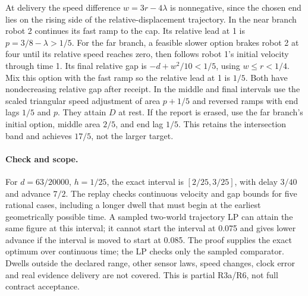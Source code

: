 \documentclass[11pt]{article}
\begin{document}
At delivery the speed difference \(w=3r-4\lambda\) is
nonnegative, since the chosen end lies on the rising side
of the relative-displacement trajectory. In the near
branch robot 2 continues its fast ramp to the cap. Its
relative lead at 1 is \(p=3/8-\lambda>1/5\).
For the far branch, a feasible slower option brakes robot 2
at four until its relative speed reaches zero, then follows
robot 1's initial velocity through time 1. Its final relative
gap is \(-d+w^2/10<1/5\), using \(w\le r<1/4\).
Mix this option with the fast ramp so the relative lead at 1
is \(1/5\). Both have nondecreasing relative gap after receipt.
In the middle and final intervals use the scaled triangular
speed adjustment of area \(p+1/5\) and reversed ramps with
end lags \(1/5\) and \(p\). They attain \(D\) at rest.
If the report is erased, use the far branch's initial option,
middle area \(2/5\), and end lag \(1/5\). This retains the
intersection band and achieves \(17/5\), not the larger target.

\paragraph{Check and scope.}
For \(d=63/20000\), \(h=1/25\), the exact interval is
\([2/25,3/25]\), with delay \(3/40\) and advance \(7/2\).
The replay checks continuous velocity and gap bounds for
five rational cases, including a longer dwell that must begin at the earliest geometrically possible time. A sampled two-world trajectory LP
can attain the same figure at this interval; it cannot
start the interval at 0.075 and gives lower advance if
the interval is moved to start at 0.085. The proof supplies
the exact optimum over continuous time; the LP checks only the
sampled comparator. Dwells outside the declared range, other sensor laws, speed
changes, clock error and real evidence delivery are not
covered. This is partial R3a/R6, not full contract acceptance.
\end{document}

